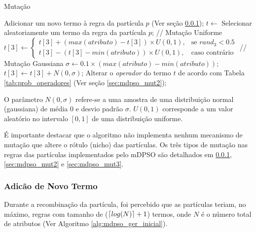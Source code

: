 \documentclass[
	12pt,				%
	openany,			%
	oneside,	
	a4paper,			%
	brazil,				%
	]{unimontes-ppgmsc-abntex2}
\DeclarePairedDelimiter{\ceil}{\lceil}{\rceil}
\begin{document}
\begin{algorithm}[ht]
\caption{Mutação}
\label{alg:mut}
\begin{algorithmic}[1]
	\State Adicionar um novo termo à regra da partícula $p$ (Ver seção \ref{sec:mdpso_mut1});
\Else
  \State $t \leftarrow$ Selecionar aleatoriamente um termo da regra da partícula $p$;
          \State // Mutação Uniforme  
          \State $t[3] \leftarrow \begin{cases} 
          				             t[3] + (max(atributo) - t[3]) \times U{(0, 1)}, & \mbox{se } rand_3 < 0.5 \\
          				             t[3] - (t[3] - min(atributo)) \times U{(0, 1)}, & \mbox{caso contrário}
          		                   \end{cases}$    
      \Else
          \State // Mutação Gaussiana
          \State $\sigma \leftarrow 0.1 \times (max(atributo) - min(atributo))$;
          \State $t[3] \leftarrow t[3] + N(0, \sigma)$;  
      \EndIf
  \Else
      \State Alterar o {\em operador} do termo $t$ de acordo com Tabela \ref{tab:prob_operadores} (Ver seção \ref{sec:mdpso_mut2});
  \EndIf
\EndIf
\end{algorithmic}
\end{algorithm}

O parâmetro $N(0, \sigma)$ refere-se a uma amostra de uma distribuição normal (gaussiana) de média 0 e desvio padrão $\sigma$. $U{(0, 1)}$ corresponde a um valor aleatório no intervalo $[0,1]$ de uma distribuição uniforme.

É importante destacar que o algoritmo não implementa nenhum mecanismo de mutação que altere o rótulo (nicho) das partículas. Os três tipos de mutação nas regras das partículas implementados pelo mDPSO são detalhados em \ref{sec:mdpso_mut1}, \ref{sec:mdpso_mut2} e \ref{sec:mdpso_mut3}.

\subsubsection{Adicão de Novo Termo}
\label{sec:mdpso_mut1} 

Durante a recombinação da partícula, foi percebido que as partículas teriam, no máximo, regras com tamanho de ($\ceil{log(N)} + 1$) termos, onde $N$ é o número total de atributos (Ver Algoritmo \ref{alg:mdpso_ger_inicial}). 
\end{document}
